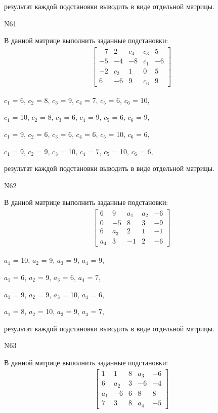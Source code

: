 \documentclass[11pt]{report}
\begin{document}
результат каждой подстановки выводить в виде отдельной матрицы.

N61

В данной матрице выполнить заданные подстановки:
\begin{align*}
\left[\begin{matrix}-7 & 2 & c_{4} & c_{3} & 5\\-5 & -4 & -8 & c_{1} & -6\\-2 & c_{2} & 1 & 0 & 5\\6 & -6 & 9 & c_{6} & 9\end{matrix}\right]
\end{align*}


$c_{1}$ = 6, $c_{2}$ = 8, $c_{3}$ = 9, $c_{4}$ = 7, $c_{5}$ = 6, $c_{6}$ = 10, 

$c_{1}$ = 10, $c_{2}$ = 8, $c_{3}$ = 6, $c_{4}$ = 9, $c_{5}$ = 6, $c_{6}$ = 9, 

$c_{1}$ = 9, $c_{2}$ = 6, $c_{3}$ = 6, $c_{4}$ = 6, $c_{5}$ = 10, $c_{6}$ = 6, 

$c_{1}$ = 9, $c_{2}$ = 9, $c_{3}$ = 10, $c_{4}$ = 7, $c_{5}$ = 10, $c_{6}$ = 6, 

результат каждой подстановки выводить в виде отдельной матрицы.

N62

В данной матрице выполнить заданные подстановки:
\begin{align*}
\left[\begin{matrix}6 & 9 & a_{1} & a_{2} & -6\\0 & -5 & 8 & 3 & -9\\6 & a_{3} & 2 & 1 & -1\\a_{4} & 3 & -1 & 2 & -6\end{matrix}\right]
\end{align*}


$a_{1}$ = 10, $a_{2}$ = 9, $a_{3}$ = 9, $a_{4}$ = 9, 

$a_{1}$ = 6, $a_{2}$ = 9, $a_{3}$ = 6, $a_{4}$ = 7, 

$a_{1}$ = 9, $a_{2}$ = 9, $a_{3}$ = 10, $a_{4}$ = 6, 

$a_{1}$ = 8, $a_{2}$ = 10, $a_{3}$ = 9, $a_{4}$ = 7, 

результат каждой подстановки выводить в виде отдельной матрицы.

N63

В данной матрице выполнить заданные подстановки:
\begin{align*}
\left[\begin{matrix}1 & 1 & 8 & a_{3} & -6\\6 & a_{2} & 3 & -6 & -4\\a_{1} & -6 & 6 & 8 & 8\\7 & 3 & 8 & a_{4} & -5\end{matrix}\right]
\end{align*}
\end{document}
